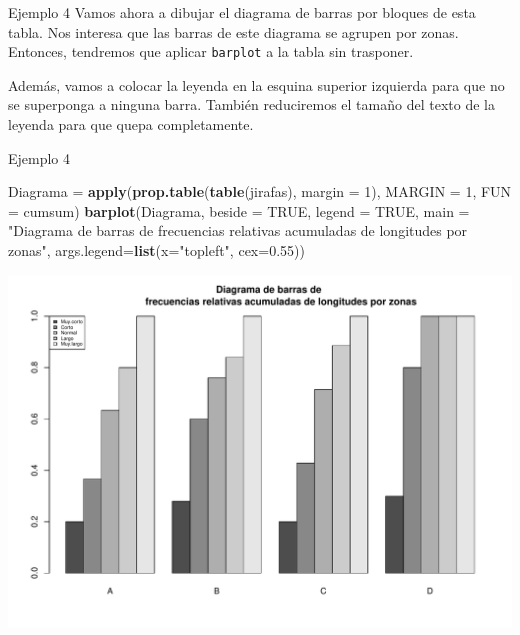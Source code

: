 \documentclass[
  ignorenonframetext,
]{beamer}
\newenvironment{Shaded}{\begin{snugshade}}{\end{snugshade}}
\newcommand{\AttributeTok}[1]{\textcolor[rgb]{0.13,0.29,0.53}{#1}}
\newcommand{\ConstantTok}[1]{\textcolor[rgb]{0.56,0.35,0.01}{#1}}
\newcommand{\DecValTok}[1]{\textcolor[rgb]{0.00,0.00,0.81}{#1}}
\newcommand{\FloatTok}[1]{\textcolor[rgb]{0.00,0.00,0.81}{#1}}
\newcommand{\FunctionTok}[1]{\textcolor[rgb]{0.13,0.29,0.53}{\textbf{#1}}}
\newcommand{\NormalTok}[1]{#1}
\newcommand{\OtherTok}[1]{\textcolor[rgb]{0.56,0.35,0.01}{#1}}
\newcommand{\StringTok}[1]{\textcolor[rgb]{0.31,0.60,0.02}{#1}}
\begin{document}
\begin{frame}[fragile]{Ejemplo 4}
\label{ejemplo-4-12}
Vamos ahora a dibujar el diagrama de barras por bloques de esta tabla.
Nos interesa que las barras de este diagrama se agrupen por zonas.
Entonces, tendremos que aplicar \texttt{barplot} a la tabla sin
trasponer.

Además, vamos a colocar la leyenda en la esquina superior izquierda para
que no se superponga a ninguna barra. También reduciremos el tamaño del
texto de la leyenda para que quepa completamente.
\end{frame}

\begin{frame}[fragile]{Ejemplo 4}
\label{ejemplo-4-13}
\begin{Shaded}
\begin{Highlighting}[]
\NormalTok{Diagrama }\OtherTok{=} \FunctionTok{apply}\NormalTok{(}\FunctionTok{prop.table}\NormalTok{(}\FunctionTok{table}\NormalTok{(jirafas), }\AttributeTok{margin =} \DecValTok{1}\NormalTok{), }\AttributeTok{MARGIN =} \DecValTok{1}\NormalTok{, }\AttributeTok{FUN =}\NormalTok{ cumsum)}
\FunctionTok{barplot}\NormalTok{(Diagrama, }\AttributeTok{beside =} \ConstantTok{TRUE}\NormalTok{, }\AttributeTok{legend =} \ConstantTok{TRUE}\NormalTok{, }\AttributeTok{main =} \StringTok{"Diagrama de barras de }
\StringTok{        frecuencias relativas acumuladas de longitudes por zonas"}\NormalTok{,}
\AttributeTok{args.legend=}\FunctionTok{list}\NormalTok{(}\AttributeTok{x=}\StringTok{"topleft"}\NormalTok{, }\AttributeTok{cex=}\FloatTok{0.55}\NormalTok{))}
\end{Highlighting}
\end{Shaded}

\includegraphics[width=0.8\linewidth]{R_base_files/figure-beamer/unnamed-chunk-152-1}
\end{frame}
\end{document}
